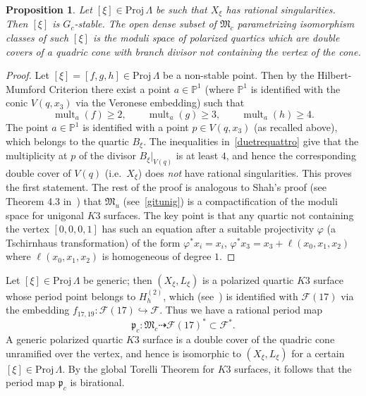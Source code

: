 \documentclass[11pt]{amsart}
\numberwithin{equation}{section}
\theoremstyle{plain}
\newtheorem{proposition}[theorem]{Proposition}
\theoremstyle{remark}
\theoremstyle{definition}
\newcommand{\cF}{\mathscr{F}}
\newcommand{\gp}{\mathfrak{p}}
\newcommand{\Proj}{\mathrm{Proj}}
\newcommand{\dra}{\dashrightarrow}
\newcommand{\gM}{\mathfrak{M}}
\newcommand{\hra}{\hookrightarrow}
\newcommand{\PP}{{\mathbb P}}
\DeclareMathOperator{\mult}{mult}
\begin{document}
%
\begin{proposition}
%
Let  $[\xi]\in\Proj\,\Lambda$ be such that $X_{\xi}$ has rational singularities. Then $[\xi]$ is $G_c$-stable. 
The open dense subset of $\gM_c$ parametrizing isomorphism classes of such $[\xi]$ is the moduli space of polarized quartics which are double covers of a quadric cone with branch divisor not containing the vertex of the cone.
%
\end{proposition}
%
\begin{proof}
%
Let $[\xi]=[f,g,h]\in\Proj\,\Lambda$ be a non-stable point. Then by the Hilbert-Mumford Criterion there exist a point $a\in\PP^1$ (where $\PP^1$ is identified with the conic $V(q,x_3)$ via the Veronese embedding)
such that 
%
\begin{equation}\label{duetrequattro}
%
\mult_a (f)\ge 2,\qquad \mult_a (g)\ge 3,\qquad \mult_a (h)\ge 4.
%
\end{equation}
%
The point $a\in\PP^1$ is identified with a point   $p\in V(q,x_3)$ (as recalled above), which belongs to the quartic $B_{\xi}$. 
The inequalities in~\eqref{duetrequattro} give that the multiplicity at $p$ of the divisor $B_{\xi}|_{V(q)}$ is at least $4$, and hence the corresponding double cover of $V(q)$ (i.e.~$X_{\xi}$) does \emph{not} have rational singularities. This proves the first statement.
The rest of the proof is analogous to Shah's proof  (see Theorem 4.3 in~\cite{shah}) that $\gM_u$ (see~\eqref{gitunig}) is a compactification of the moduli space  for unigonal $K3$ surfaces. 
The key point is that any quartic not containing the vertex $[0,0,0,1]$ has such an equation after a suitable projectivity $\varphi$  (a Tschirnhaus transformation) of the form $\varphi^{*}x_i=x_i$, $\varphi^{*}x_3=x_3+\ell(x_0,x_1,x_2)$ where  $\ell(x_0,x_1,x_2)$ is homogeneous of degree $1$. 
%
\end{proof}
%
Let $[\xi]\in \Proj\,\Lambda$ be generic; then $(X_{\xi},L_{\xi})$ is a polarized quartic $K3$ surface whose period point belongs to $H_h^{(2)}$, which (see~\cite{log1}) is identified with $\cF(17)$ via the embedding $f_{17,19}\colon\cF(17)\hra\cF$.
Thus we have a rational period map
%
\begin{equation}\label{coneperiods}
%
\gp_c\colon \gM_c \dra \cF(17)^{*}\subset\cF^{*}.
%
\end{equation}
%
A generic polarized quartic $K3$ surface is a double cover of the quadric cone unramified over the vertex, and hence is isomorphic to  $(X_{\xi},L_{\xi})$ for a certain 
$[\xi]\in \Proj\,\Lambda$. By the global Torelli Theorem for $K3$ surfaces, it follows that the period map $\gp_c$ is birational.  
%
\end{document}
